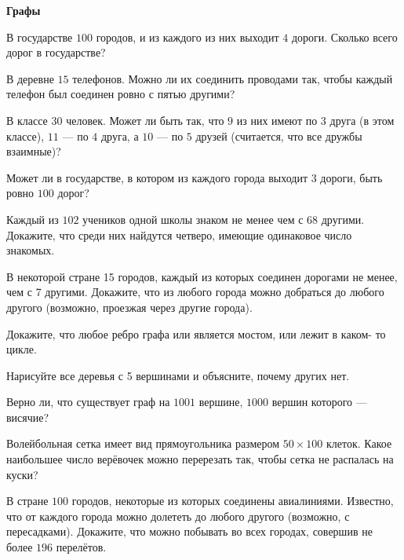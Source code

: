 \documentclass{article}
\begin{document}
    \large

    \begin{center}
        \textbf{Графы}
    \end{center}


    \begin{enumerate_boxed}

        \item В государстве $100$ городов, и из каждого из них выходит $4$ дороги.
        Сколько всего дорог в государстве?

        \item В деревне $15$ телефонов.
        Можно ли их соединить проводами так, чтобы каждый телефон был соединен ровно с пятью другими?

        \item В классе $30$ человек.
        Может ли быть так, что $9$ из них имеют по $3$ друга (в этом классе), $11$ — по $4$ друга, а $10$ — по $5$ друзей (считается, что все дружбы взаимные)?

        \item Может ли в государстве, в котором из каждого города выходит $3$ дороги, быть ровно $100$ дорог?

        \item Каждый из $102$ учеников одной школы знаком не менее чем с $68$ другими.
        Докажите, что среди них найдутся четверо, имеющие одинаковое число знакомых.

        \item В некоторой стране 15 городов, каждый из которых соединен дорогами не менее, чем с 7 другими.
        Докажите, что из любого города можно добраться до любого другого (возможно, проезжая через другие города).

        \item Докажите, что любое ребро графа или является мостом, или лежит в каком- то цикле.

        \item Нарисуйте все деревья с 5 вершинами и объясните, почему других нет.

        \item Верно ли, что существует граф на $1001$ вершине, $1000$ вершин которого — висячие?

        \item Волейбольная сетка имеет вид прямоугольника размером $50 \times 100$ клеток.
        Какое наибольшее число верёвочек можно перерезать так, чтобы сетка не распалась на куски?

        \item В стране $100$ городов, некоторые из которых соединены авиалиниями.
        Известно, что от каждого города можно долететь до любого другого (возможно, с пересадками).
        Докажите, что можно побывать во всех городах, совершив не более $196$ перелётов.


\end{enumerate_boxed}
\end{document}
